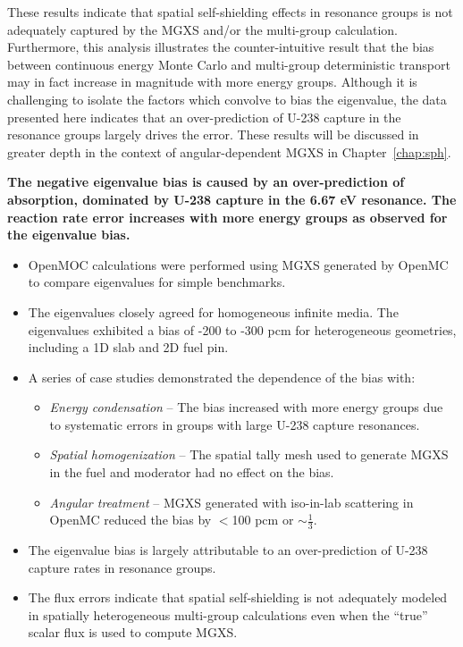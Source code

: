 These results indicate that spatial self-shielding effects in resonance groups is not adequately captured by the \ac{MGXS} and/or the multi-group calculation. Furthermore, this analysis illustrates the counter-intuitive result that the bias between continuous energy Monte Carlo and multi-group deterministic transport may in fact increase in magnitude with more energy groups. Although it is challenging to isolate the factors which convolve to bias the eigenvalue, the data presented here indicates that an over-prediction of U-238 capture in the resonance groups largely drives the error. These results will be discussed in greater depth in the context of angular-dependent \ac{MGXS} in Chapter~\ref{chap:sph}.

\begin{emphbox}
\textbf{The negative eigenvalue bias is caused by an over-prediction of absorption, dominated by U-238 capture in the 6.67 eV resonance. The reaction rate error increases with more energy groups as observed for the eigenvalue bias.}
\end{emphbox}

\clearpage

\vfill
\begin{highlightsbox}[frametitle=Highlights]
\begin{itemize}
  \item OpenMOC calculations were performed using \ac{MGXS} generated by OpenMC to compare eigenvalues for simple benchmarks.
  \item The eigenvalues closely agreed for homogeneous infinite media. The eigenvalues exhibited a bias of -200 to -300 \ac{pcm} for heterogeneous geometries, including a 1D slab and 2D fuel pin.
  \item A series of case studies demonstrated the dependence of the bias with:
  \begin{itemize}
    \item \textit{Energy condensation} -- The bias increased with more energy groups due to systematic errors in groups with large U-238 capture resonances.
    \item \textit{Spatial homogenization} -- The spatial tally mesh used to generate \ac{MGXS} in the fuel and moderator had no effect on the bias.
    \item \textit{Angular treatment} -- \ac{MGXS} generated with iso-in-lab scattering in OpenMC reduced the bias by $<$100 \ac{pcm} or $\sim\frac{1}{3}$.
  \end{itemize} 
  \item The eigenvalue bias is largely attributable to an over-prediction of U-238 capture rates in resonance groups.
  \item The flux errors indicate that spatial self-shielding is not adequately modeled in spatially heterogeneous multi-group calculations even when the ``true'' scalar flux is used to compute \ac{MGXS}.
\end{itemize}
\end{highlightsbox}
\vfill